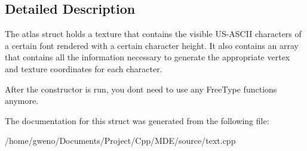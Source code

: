 \subsection{Detailed Description}
The atlas struct holds a texture that contains the visible U\+S-\/\+A\+S\+C\+II characters of a certain font rendered with a certain character height. It also contains an array that contains all the information necessary to generate the appropriate vertex and texture coordinates for each character.

After the constructor is run, you don\textquotesingle{}t need to use any Free\+Type functions anymore. 

The documentation for this struct was generated from the following file\+:\begin{DoxyCompactItemize}
\item 
/home/gweno/\+Documents/\+Project/\+Cpp/\+M\+D\+E/source/text.\+cpp\end{DoxyCompactItemize}
